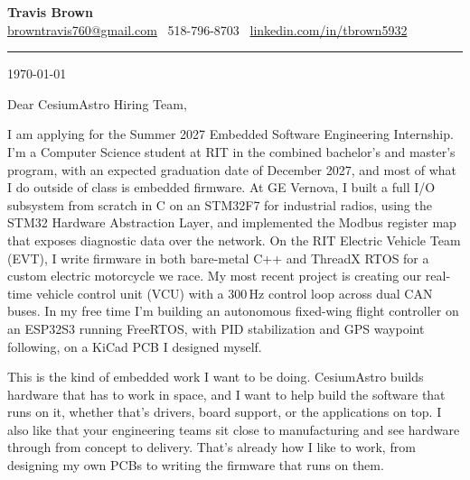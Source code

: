 \documentclass[11pt]{article}
\begin{document}
\begin{center}
  {\LARGE\textbf{Travis Brown}}\\[3pt]
  \href{mailto:browntravis760@gmail.com}{browntravis760@gmail.com} \textbullet\
  518-796-8703 \textbullet\
  \href{https://www.linkedin.com/in/tbrown5932}{linkedin.com/in/tbrown5932}
\end{center}

\vspace{2pt}
\noindent\rule{\linewidth}{0.5pt}
\vspace{10pt}

\begin{flushright}
  \today
\end{flushright}

\vspace{4pt}

Dear CesiumAstro Hiring Team,

I am applying for the Summer 2027 Embedded Software Engineering Internship.
I'm a Computer Science student at RIT in the combined bachelor's and
master's program, with an expected graduation date of December 2027, and
most of what I do outside of class is embedded firmware. At GE Vernova, I
built a full I/O subsystem from scratch in C on an
STM32F7 for industrial radios, using the STM32 Hardware Abstraction Layer, and
implemented the Modbus register map that exposes diagnostic data over the
network. On the RIT Electric Vehicle Team (EVT), I write firmware in both
bare-metal C++ and ThreadX RTOS for a custom electric motorcycle we race. My most recent project is creating our real-time vehicle control unit (VCU) with a 300\,Hz control loop across dual CAN buses. In my free time I'm building an autonomous
fixed-wing flight controller on an ESP32S3 running FreeRTOS, with PID
stabilization and GPS waypoint following, on a KiCad PCB I designed myself.

This is the kind of embedded work I want to be doing. CesiumAstro builds
hardware that has to work in space, and I want to help build the software
that runs on it, whether that's drivers, board support, or the
applications on top. I also like that your engineering teams sit close to
manufacturing and see hardware through from concept to delivery. That's
already how I like to work, from designing my own PCBs to writing the
firmware that runs on them.
\end{document}

